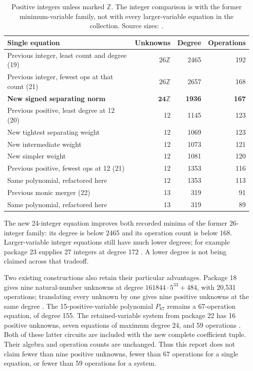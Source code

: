 \documentclass[11pt,letterpaper]{article}
\newcommand{\Z}{\mathbb Z}
\theoremstyle{remark}
\begin{document}
\begin{table}[htbp]
\centering\small
\begin{tabular}{p{2.31in}rrr}
\toprule
Single equation & Unknowns & Degree & Operations\\
\midrule
Previous integer, least count and degree (19) & $26\Z$ &2465&192\\
Previous integer, fewest ops at that count (21) &$26\Z$&2657&168\\
\textbf{New signed separating norm} &$\mathbf{24\Z}$&\textbf{1936}&\textbf{167}\\
\midrule
Previous positive, least degree at 12 (20)&12&1145&123\\
New tightest separating weight&12&1069&123\\
New intermediate weight&12&1073&121\\
New simpler weight&12&1081&120\\
\midrule
Previous positive, fewest ops at 12 (21)&12&1353&116\\
Same polynomial, refactored here&12&1353&113\\
\midrule
Previous monic merger (22)&13&319&91\\
Same polynomial, refactored here&13&319&89\\
\bottomrule
\end{tabular}
\caption{Positive integers unless marked $\Z$.  The integer comparison is
with the former minimum-variable family, not with every larger-variable
equation in the collection.  Source sizes: \cite{repo19,repo20,repo21,repo22}.}
\label{tab:comparison}
\end{table}

The new 24-integer equation improves both recorded minima of the former
26-integer family: its degree is below 2465 and its operation count is
below 168.  Larger-variable integer equations still have much lower
degrees; for example package 23 supplies 27 integers at degree 172
\cite{repo23}.  A lower degree is not being claimed across that tradeoff.

Two existing constructions also retain their particular advantages.
Package 18 gives nine natural-number unknowns at degree
$161844\cdot5^{33}+484$, with 20,531 operations; translating every unknown
by one gives nine positive unknowns at the same degree
\cite{repo18}.  The 15-positive-variable polynomial $P_{67}$ remains a
67-operation equation, of degree 155.  The retained-variable system from
package 22 has 16 positive unknowns, seven equations of maximum degree 24,
and 59 operations \cite{baseline67,retained59}.  Both of these latter
circuits are included with the new complete coefficient tuple.  Their
algebra and operation counts are unchanged.  Thus this report does not
claim fewer than nine positive unknowns, fewer than 67 operations for a
single equation, or fewer than 59 operations for a system.
\end{document}
